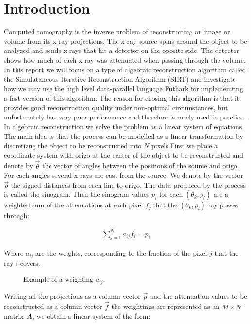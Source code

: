 \section{Introduction}
Computed tomography is the inverse problem of reconstructing an image or volume from its x-ray projections. The x-ray source spins around the object to be analyzed and sends x-rays that hit a detector on the oposite side. The detector shows how much of each x-ray was attenuated when passing through the volume. In this report we will focus on a type of algebraic reconstruction algorithm called the Simulataneous Iterative Reconstruction Algorithm (SIRT) and investigate how we may use the high level data-parallel language Futhark for implememting a fast version of this algorithm. The reason for chosing this algorithm is that it provides good reconstruction quality under non-optimal circumstances, but unfortunately has very poor performance and therefore is rarely used in practice .\\
In algebraic reconstruction we solve the problem as a linear system of equations. The main idea is that the process can be modelled as a linear transformation by discretizng the object to be reconstructed into $N$ pixels.First we place a coordinate system with origo at the center of the object to be reconstructed and denote by $\vec{\theta}$ the vector of angles between the positions of the source and origo. For each angles several x-rays are cast from the source. We denote by the vector $\vec{\rho}$ the signed distances from each line to origo. The data produced by the process is called the sinogram. Then the sinogram values $p_i$ for each $(\theta_k,\rho_l)$  are a weighted sum of the attenuations at each pixel $f_j$ that the $(\theta_k,\rho_l)$ ray passes through:

\begin{align}
\sum_{j=1}^N a_{ij}f_j=p_i
\end{align}

Where $a_{ij}$ are the weights, corresponding to the fraction of the pixel $j$ that the ray $i$ covers.

\begin{figure}
\centering
{}
\caption{Example of a weighting $a_{ij}$.}
\label{fig:weightings}
\end{figure}
Writing all the projections as a column vector $\vec{p}$ and the attenuation values to be reconstructed as a column vector $\vec{f}$ the weightings are represented as an $M\times N$ matrix $\mat{A}$, we obtain a linear system of the form:

